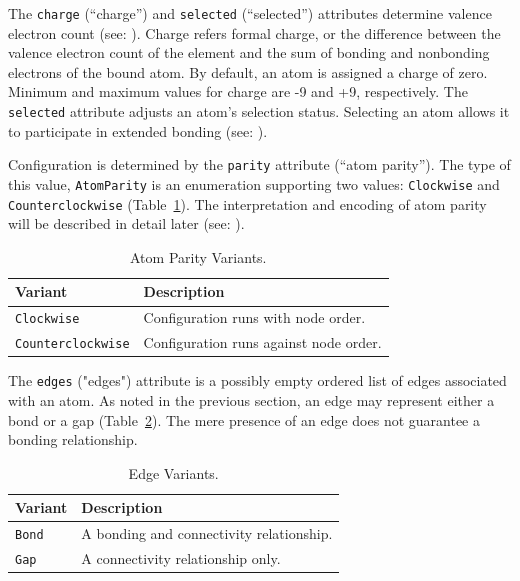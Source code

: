 \documentclass{article}
\def\ttt{\texttt}
\begin{document}
The \ttt{charge} (\enquote{charge}) and \ttt{selected} (\enquote{selected}) attributes determine valence electron count (see: ). Charge refers formal charge, or the difference between the valence electron count of the element and the sum of bonding and nonbonding electrons of the bound atom. By default, an atom is assigned a charge of zero. Minimum and maximum values for charge are -9 and +9, respectively. The \ttt{selected} attribute adjusts an atom's selection status. Selecting an atom allows it to participate in extended bonding (see: ).

Configuration is determined by the \ttt{parity} attribute (\enquote{atom parity}). The type of this value, \ttt{AtomParity} is an enumeration supporting two values: \ttt{Clockwise} and \ttt{Counterclockwise} (Table~\ref{table:atom-parity-variants}). The interpretation and encoding of atom parity will be described in detail later (see: ).

\begin{table}
\caption{Atom Parity Variants.}
\centering
\begin{tabular}{l l}
    \hline
    Variant & Description  \\
    \hline
    \ttt{Clockwise} & Configuration runs with node order. \\
    \ttt{Counterclockwise} & Configuration runs against node order. \\
    \hline
\end{tabular}
\label{table:atom-parity-variants}
\end{table}

The \ttt{edges} ("edges") attribute is a possibly empty ordered list of edges associated with an atom. As noted in the previous section, an edge may represent either a bond or a gap (Table~\ref{table:edge-variants}). The mere presence of an edge does not guarantee a bonding relationship.

\begin{table}
\caption{Edge Variants.}
\centering
\begin{tabular}{l l}
    \hline
    Variant & Description  \\
    \hline
    \ttt{Bond} & A bonding and connectivity relationship. \\
    \ttt{Gap} & A connectivity relationship only. \\
    \hline
\end{tabular}
\label{table:edge-variants}
\end{table}
\end{document}
